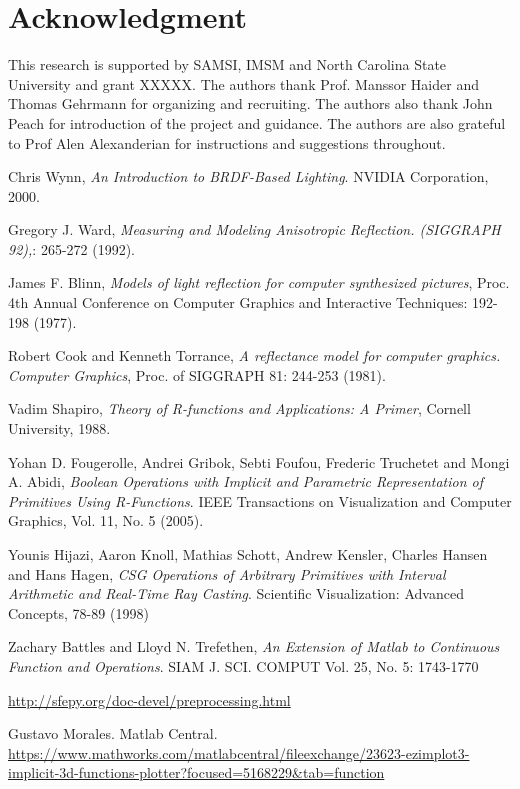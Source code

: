 \documentclass[11pt]{amsart}
\theoremstyle{definition}
\begin{document}
\section{Acknowledgment}
This research is supported by SAMSI, IMSM and North Carolina State University and grant XXXXX. The authors thank Prof.  Manssor Haider and Thomas Gehrmann for organizing and recruiting. The authors also thank John Peach for introduction of the project and guidance. The authors are also grateful to Prof Alen Alexanderian for instructions and suggestions throughout. 
\begin{thebibliography}{9}
Chris Wynn,
\emph{An Introduction to BRDF-Based Lighting}.
NVIDIA Corporation, 2000.

Gregory J. Ward, 
\emph{Measuring and Modeling Anisotropic Reflection. (SIGGRAPH 92),}: 265-272 (1992).

James F. Blinn,  
\emph{Models of light reflection for computer synthesized pictures}, Proc. 4th
Annual Conference on Computer Graphics and Interactive Techniques: 192-198
(1977). 

Robert Cook and Kenneth Torrance,
\emph{A reflectance model for computer graphics. Computer Graphics}, Proc. of SIGGRAPH 81: 244-253 (1981).  

Vadim Shapiro,
\emph{Theory of R-functions and Applications: A Primer}, Cornell University, 1988.

Yohan D. Fougerolle, Andrei Gribok, Sebti Foufou, Frederic Truchetet and Mongi A. Abidi,
\emph{Boolean Operations with Implicit and Parametric Representation of Primitives Using R-Functions}.
IEEE Transactions on Visualization and Computer Graphics, Vol. 11, No. 5 (2005).

Younis Hijazi, Aaron Knoll, Mathias Schott, Andrew Kensler, Charles Hansen and Hans Hagen,
\emph{CSG Operations of Arbitrary Primitives with Interval Arithmetic and Real-Time Ray Casting}.
Scientific Visualization: Advanced Concepts, 78-89 (1998) 
	
 
  Zachary Battles and Lloyd N. Trefethen,
  \emph{An Extension of Matlab to Continuous Function and Operations}.
  SIAM J. SCI. COMPUT Vol. 25, No. 5: 1743-1770 
 
\url{http://sfepy.org/doc-devel/preprocessing.html}

Gustavo Morales. Matlab Central.\\
\url{https://www.mathworks.com/matlabcentral/fileexchange/23623-ezimplot3-implicit-3d-functions-plotter?focused=5168229&tab=function}


	



\end{thebibliography}


%
\end{document}
